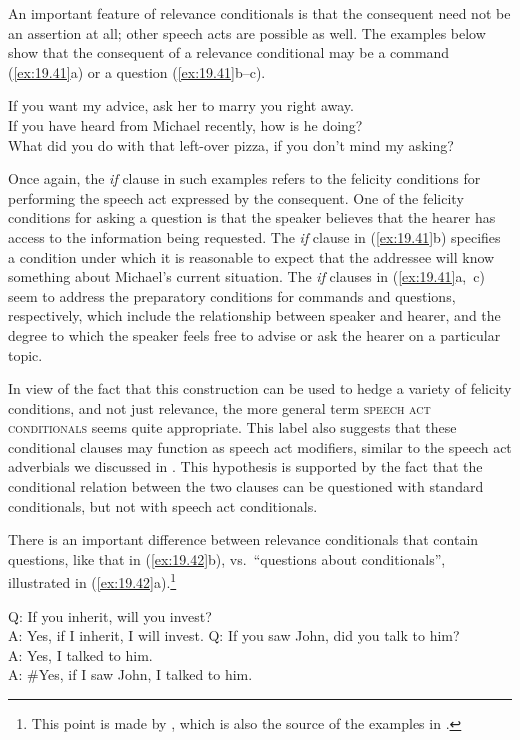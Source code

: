 An important feature of relevance conditionals is that the consequent need not be an assertion at all; other speech acts are possible as well. The examples below show that the consequent of a relevance conditional may be a command (\ref{ex:19.41}a) or a question (\ref{ex:19.41}b--c). 


\ea \label{ex:19.41}
\ea  If you want my advice, ask her to marry you right away.\\
\ex If you have heard from Michael recently, how is he doing?\\
\ex What did you do with that left-over pizza, if you don’t mind my asking?
                       \z
\z


Once again, the \textit{if} clause in such examples refers to the felicity conditions for performing the speech act expressed by the consequent. One of the felicity conditions for asking a question is that the speaker believes that the hearer has access to the information being requested. The \textit{if} clause in (\ref{ex:19.41}b) specifies a condition under which it is reasonable to expect that the addressee will know something about Michael’s current situation. The \textit{if} clauses in (\ref{ex:19.41}a,~c) seem to address the preparatory conditions for commands and questions, respectively, which include the relationship between speaker and hearer, and the degree to which the speaker feels free to advise or ask the hearer on a particular topic.



In view of the fact that this construction can be used to hedge a variety of felicity conditions, and not just relevance, the more general term \textsc{speech act conditionals} seems quite appropriate. This label also suggests that these conditional clauses may function as speech act modifiers, similar to the speech act adverbials we discussed in . This hypothesis is supported by the fact that the conditional relation between the two clauses can be questioned with standard conditionals, but not with speech act conditionals.



There is an important difference between relevance conditionals that contain questions, like that in (\ref{ex:19.42}b), vs.~“questions about conditionals”, illustrated in (\ref{ex:19.42}a).\footnote{This point is made by \citet{vanderAuwera1986}, which is also the source of the examples in .}


\ea \label{ex:19.42}
\ea   Q: If you inherit, will you invest?\\
A: Yes, if I inherit, I will invest.
\ex  Q: If you saw John, did you talk to him?\\
A: Yes, I talked to him.\\
A: \#Yes, if I saw John, I talked to him.
\z \z


